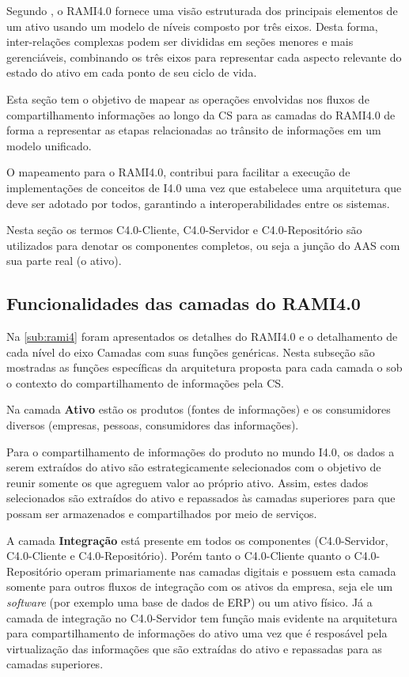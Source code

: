 Segundo , o RAMI4.0 fornece uma visão estruturada dos principais elementos de um ativo usando um modelo de níveis composto por três eixos. Desta forma, inter-relações complexas podem ser divididas em seções menores e mais gerenciáveis, combinando os três eixos para representar cada aspecto relevante do estado do ativo em cada ponto de seu ciclo de vida.

Esta seção tem o objetivo de mapear as operações envolvidas nos fluxos de compartilhamento informações ao longo da CS para as camadas do RAMI4.0 de forma a representar as etapas relacionadas ao trânsito de informações em um modelo unificado.

O mapeamento para o RAMI4.0, contribui para facilitar a execução de implementações de conceitos de I4.0 uma vez que estabelece uma arquitetura que deve ser adotado por todos, garantindo a interoperabilidades entre os sistemas.

Nesta seção os termos C4.0-Cliente, C4.0-Servidor e C4.0-Repositório são utilizados para denotar os componentes completos, ou seja a junção do AAS com sua parte real (o ativo).

\subsection{Funcionalidades das camadas do RAMI4.0}

Na \autoref{sub:rami4} foram apresentados os detalhes do RAMI4.0 e o detalhamento de cada nível do eixo Camadas com suas funções genéricas. Nesta subseção são mostradas as funções específicas da arquitetura proposta para cada camada o sob o contexto do compartilhamento de informações pela CS.

Na camada \textbf{Ativo} estão os produtos (fontes de informações) e os consumidores diversos (empresas, pessoas, consumidores das informações).

Para o compartilhamento de informações do produto no mundo I4.0, os dados a serem extraídos do ativo são estrategicamente selecionados com o objetivo de reunir somente os que agreguem valor ao próprio ativo. Assim, estes dados selecionados são extraídos do ativo e repassados às camadas superiores para que possam ser armazenados e compartilhados por meio de serviços.

A camada \textbf{Integração} está presente em todos os componentes (C4.0-Servidor, C4.0-Cliente e C4.0-Repositório). Porém tanto o C4.0-Cliente quanto o C4.0-Repositório operam primariamente nas camadas digitais e possuem esta camada somente para outros fluxos de integração com os ativos da empresa, seja ele um \textit{software} (por exemplo uma base de dados de ERP) ou um ativo físico. Já a camada de integração no C4.0-Servidor tem função mais evidente na arquitetura para compartilhamento de informações do ativo uma vez que é resposável pela virtualização das informações que são extraídas do ativo e repassadas para as camadas superiores.

